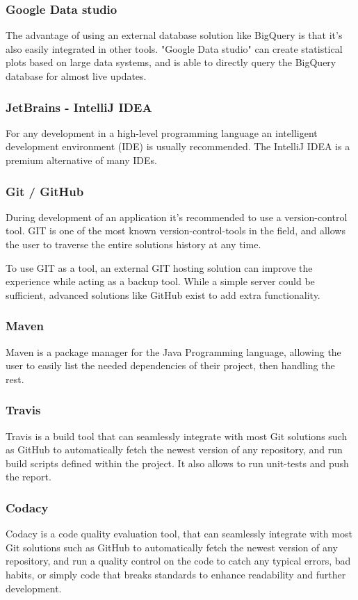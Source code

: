 \documentclass[a4paper]{article}
\begin{document}
\subsubsection{Google Data studio}
\label{sec:datastudio}
The advantage of using an external database solution like BigQuery is that it's also easily
integrated in other tools. "Google Data studio" can create statistical plots based on large
data systems, and is able to directly query the BigQuery database for almost live updates.

\subsubsection{JetBrains - IntelliJ IDEA}
For any development in a high-level programming language an intelligent development environment
(IDE) is usually recommended. The IntelliJ IDEA is a premium alternative of many IDEs.

\subsubsection{Git / GitHub}
During development of an application it's recommended to use a version-control tool. GIT is
one of the most known version-control-tools in the field, and allows the user to traverse
the entire solutions history at any time.


To use GIT as a tool, an external GIT hosting solution can improve the experience while acting
as a backup tool. While a simple server could be sufficient, advanced solutions like GitHub
exist to add extra functionality.

\subsubsection{Maven}
Maven is a package manager for the Java Programming language, allowing the user to easily
list the needed dependencies of their project, then handling the rest.

\subsubsection{Travis}
Travis is a build tool that can seamlessly integrate with most Git solutions such as GitHub
to automatically fetch the newest version of any repository, and run build scripts defined
within the project. It also allows to run unit-tests and push the report.

\subsubsection{Codacy}
Codacy is a code quality evaluation tool, that can seamlessly integrate with most Git
solutions such as GitHub to automatically fetch the newest version of any repository,
and run a quality control on the code to catch any typical errors, bad habits, or
simply code that breaks standards to enhance readability and further development.
\end{document}
